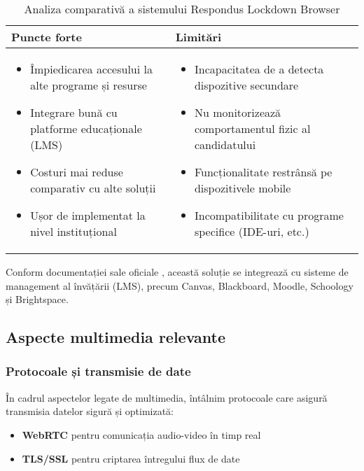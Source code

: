 \documentclass[12pt,a4paper]{article}
\begin{document}
\begin{table}[h]
\centering
\begin{tabular}{|p{8.5cm}|p{8.5cm}|}
\hline
\textbf{Puncte forte} & \textbf{Limitări} \\
\hline
\begin{itemize}
    \item Împiedicarea accesului la alte programe și resurse
    \item Integrare bună cu platforme educaționale (LMS)
    \item Costuri mai reduse comparativ cu alte soluții
    \item Ușor de implementat la nivel instituțional
\end{itemize} & 
\begin{itemize}
    \item Incapacitatea de a detecta dispozitive secundare
    \item Nu monitorizează comportamentul fizic al candidatului
    \item Funcționalitate restrânsă pe dispozitivele mobile
    \item Incompatibilitate cu programe specifice (IDE-uri, etc.)
\end{itemize} \\
\hline
\end{tabular}
\caption{Analiza comparativă a sistemului Respondus Lockdown Browser}
\end{table}

Conform documentației sale oficiale \cite{respondus}, această soluție se
integrează cu sisteme de management al învățării (LMS), precum Canvas,
Blackboard, Moodle, Schoology și Brightspace.

\subsection{Aspecte multimedia relevante}

\subsubsection{Protocoale și transmisie de date}
În cadrul aspectelor legate de multimedia, întâlnim protocoale care
asigură transmisia datelor sigură și optimizată:
\begin{itemize}
    \item \textbf{WebRTC} pentru comunicația audio-video în timp real
    \item \textbf{TLS/SSL} pentru criptarea întregului flux de date
\end{itemize}
\end{document}
